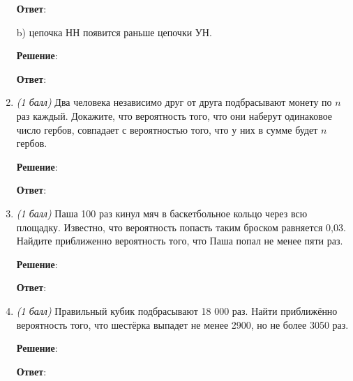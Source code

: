 \documentclass{article}
\begin{document}
\begin{enumerate}
    \textbf{Ответ}:

    b) цепочка НН появится раньше цепочки УН.

    \textbf{Решение}:





    \textbf{Ответ}:
    
    \item \textit{(1 балл)} Два человека независимо друг от друга подбрасывают монету по $n$ раз каждый. Докажите, что вероятность того, что они наберут одинаковое число гербов, совпадает с вероятностью того, что у них в сумме будет $n$ гербов.
    

    \textbf{Решение}:





    \textbf{Ответ}:
    
    \item \textit{(1 балл)} Паша 100 раз кинул мяч в баскетбольное кольцо через всю площадку. Известно, что вероятность попасть таким броском равняется 0,03. Найдите приближенно вероятность того, что Паша попал не менее пяти раз.
    

    \textbf{Решение}:





    \textbf{Ответ}:
    
    \item \textit{(1 балл)} Правильный кубик подбрасывают 18 000 раз. Найти приближённо вероятность того, что шестёрка выпадет не менее 2900, но не более 3050 раз.
    

    \textbf{Решение}:





    \textbf{Ответ}:
    
    
\end{enumerate}

  
\end{document}
